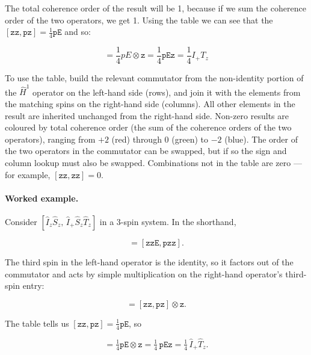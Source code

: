 \documentclass[notitlepage,11pt]{article}
\begin{document}
The total coherence order of the result will be 1, because if we sum the coherence order of the two operators, we get 1. Using the table we can see that the  $[\texttt{zz},\texttt{pz}]=\frac{1}{4}\texttt{pE}$ and so:

\begin{equation}
[I_zS_z,I_+S_zT_z] = \frac{1}{4}pE \otimes \texttt{z} = \frac{1}{4}\texttt{pEz} = \frac{1}{4} I_+ T_z
\end{equation}

To use the table, build the relevant commutator from the non-identity portion of the $\hat{H}^1$ operator on the left-hand side (rows), and join it with the elements from the matching spins on the right-hand side (columns). All other elements in the result are inherited unchanged from the right-hand side. Non-zero results are coloured by total coherence order (the sum of the coherence orders of the two operators), ranging from $+2$ (red) through $0$ (green) to $-2$ (blue). The order of the two operators in the commutator can be swapped, but if so the sign and column lookup must also be swapped. Combinations not in the table are zero — for example, $[\texttt{zz},\texttt{zz}]=0$.

\paragraph{Worked example.} Consider $[\hat{I}_z\hat{S}_z,\,\hat{I}_+\hat{S}_z\hat{T}_z]$ in a 3-spin system. In the shorthand,

\begin{equation}
[I_zS_z,I_+S_zT_z] = [\texttt{zzE},\texttt{pzz}].
\end{equation}

The third spin in the left-hand operator is the identity, so it factors out of the commutator and acts by simple multiplication on the right-hand operator's third-spin entry:

\begin{equation}
[I_zS_z,I_+S_zT_z] = [\texttt{zz},\texttt{pz}] \otimes \texttt{z}.
\end{equation}

The table tells us $[\texttt{zz},\texttt{pz}]=\tfrac{1}{4}\texttt{pE}$, so

\begin{equation}
[I_zS_z,I_+S_zT_z] = \tfrac{1}{4}\texttt{pE} \otimes \texttt{z} = \tfrac{1}{4}\,\texttt{pEz} = \tfrac{1}{4}\,\hat{I}_+\hat{T}_z.
\end{equation}
\end{document}
